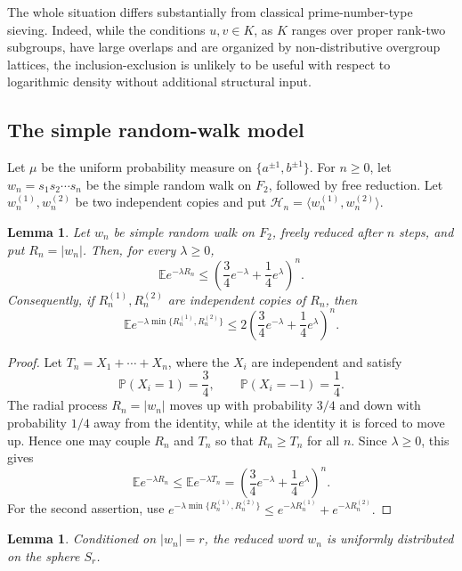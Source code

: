 \documentclass{amsproc}
\newtheorem{lemma}[theorem]{Lemma}
\newcommand{\Prob}{\mathbb P}
\newcommand{\E}{\mathbb E}
\begin{document}
The whole situation differs substantially from classical prime-number-type sieving. Indeed, while the conditions
$u,v\in K$, as $K$ ranges over proper rank-two subgroups, have large overlaps
and are organized by non-distributive overgroup lattices, the
inclusion-exclusion is unlikely to be useful with respect to logarithmic density without
additional structural input.

\subsection{The simple random-walk model}\label{S.random-walk}

Let $\mu$ be the uniform probability measure on $\{a^{\pm1},b^{\pm1}\}$.  For
$n\geq 0$, let $w_n=s_1s_2\cdots s_n$
be the simple random walk on $F_2$, followed by free reduction.  Let
$w_n^{(1)},w_n^{(2)}$ be two independent copies and put
$\mathcal H_n=\langle w_n^{(1)},w_n^{(2)}\rangle$.

\begin{lemma}\label{L.radial.exp}
Let $w_n$ be simple random walk on $F_2$, freely reduced after $n$ steps, and
put $R_n=|w_n|$.  Then, for every $\lambda\geq 0$,
\[
        \E e^{-\lambda R_n}
        \leq
        \left(\frac34 e^{-\lambda}+\frac14 e^{\lambda}\right)^n.
\]
Consequently, if $R_n^{(1)},R_n^{(2)}$ are independent copies of $R_n$, then
\[
        \E e^{-\lambda \min\{R_n^{(1)},R_n^{(2)}\}}
        \leq
        2\left(\frac34 e^{-\lambda}+\frac14 e^{\lambda}\right)^n.
\]
\end{lemma}

\begin{proof}
Let $T_n=X_1+\cdots+X_n$, where the $X_i$ are independent and satisfy
\[
        \Prob(X_i=1)=\frac34,
        \qquad
        \Prob(X_i=-1)=\frac14.
\]
The radial process $R_n=|w_n|$ moves up with probability $3/4$ and down with
probability $1/4$ away from the identity, while at the identity it is forced to
move up.  Hence one may couple $R_n$ and $T_n$ so that
$
        R_n\geq T_n
$
for all $n$.  Since $\lambda\geq 0$, this gives
\[
        \E e^{-\lambda R_n}
        \leq
        \E e^{-\lambda T_n}
        =
        \left(\frac34 e^{-\lambda}+\frac14 e^{\lambda}\right)^n.
\]
For the second assertion, use
$
        e^{-\lambda \min\{R_n^{(1)},R_n^{(2)}\}}
        \leq
        e^{-\lambda R_n^{(1)}}+e^{-\lambda R_n^{(2)}}.
$
\end{proof}

\begin{lemma}\label{L.radial.uniform}
Conditioned on $|w_n|=r$, 
the reduced word $w_n$ is uniformly distributed on the sphere $S_r$.
\end{lemma}
\end{document}
